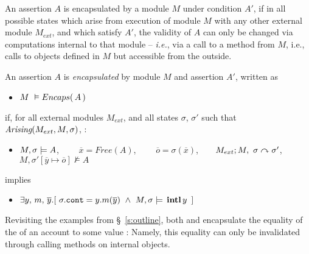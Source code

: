 {An assertion $A$  is  encapsulated by a module $M$ under condition $A'$,
if in all possible states which arise from execution of module $M$ with any other external module $M_{ext}$, and which satisfy $A'$, 
the validity of $A$} 
{ can only be changed via computations internal to that module} -- \emph{i.e.},  via a call to
a method from $M$, i.e.,
calls to objects defined in $M$ but accessible from the
outside.


\begin{definition}
\label{def:encapsulation}
An assertion $A$ is \emph{encapsulated} by module $M$ and assertion $A'$, written as
\begin{itemize}
 \item     $M\ \vDash {\ensuremath Encaps(\, A\, )}$
 \end{itemize}
if, for all external modules $M_{ext}$, and all states $\sigma$, $\sigma'$
such that $\textit{Arising}(M_{ext}, M, \sigma)$, :

\begin{itemize}
 \item
  $M , \sigma \models A$,  \ \ \ \   $\overline{x}=Free(A)$, \  \  \ \ $\overline{o}=\sigma(\overline{x})$,\ \ \ \ $M_{ext} ; M,\ \sigma \curvearrowright \sigma'$, \ \ \ ${M},{\sigma'[\overline{y}\mapsto{\overline{o}}]}\not\vDash{A}$
 \end{itemize}

implies

 \begin{itemize}
 \item   $\exists y,\,m,\, \overline{y} .[\ \sigma.\prg{cont}= y.m(\overline{y})\ \wedge\  \satisfiesA{M}{\sigma}{\internal{y}} \ ]
$
 \end{itemize}
\end{definition}

Revisiting the examples from \S~\ref{s:outline}, %
both \ModB and \ModC encapsulate   the  equality of the  of an account to some value : 
Namely, this equality can only be invalidated through calling  methods on internal objects.
 

